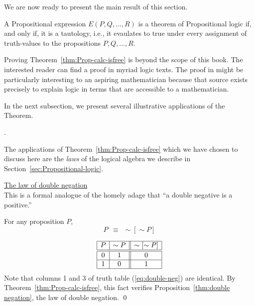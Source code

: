 We are now ready to present the main result of this section.

\begin{theorem}
\label{thm:Prop-calc-isfree}
A Propositional expression $E(P, Q, \ldots, R)$ is a theorem of
Propositional logic if, and only if, it is a tautology, i.e., it
evaulates to {\sc true} under every assignment of truth-values to the
propositions $P, Q, \ldots, R$.
\end{theorem}

Proving Theorem~\ref{thm:Prop-calc-isfree} is beyond the scope of this
book.  The interested reader can find a proof in myriad logic texts.
The proof in  \cite{Rosser53} might be particularly interesting to an
aspiring mathematician because that source exists precisely to explain
logic in terms that are accessible to a mathematician.

In the next subsection, we present several illustrative applications
of the Theorem.


\bigskip

.

The applications of Theorem~\ref{thm:Prop-calc-isfree} which we have
chosen to discuss here are the {\em laws} of the logical algebra we
describe in Section~\ref{sec:Propositional-logic}.

\bigskip

\noindent
\underline{\small\sf The law of double negation} \\
This is a formal analogue of the homely adage that ``a double negative
is a positive.''

\begin{prop}
\label{thm:double negation}
For any proposition $P$,
\[ P \ \ \equiv \ \ \sim [\sim P] \]
\end{prop}

\begin{equation}
\label{eq:double-neg}
\begin{array}{|c|c||c|}
\hline
P & \sim P & \sim[\sim P] \\
\hline
\hline
0 & 1 & 0 \\
\hline
1 & 0 & 1 \\
\hline
\end{array}
\end{equation}
Note that columns 1 and 3 of truth table (\ref{eq:double-neg}) are
identical.  By Theorem~\ref{thm:Prop-calc-isfree}, this fact verifies
Proposition~\ref{thm:double negation}, the law of double negation.
\qed


